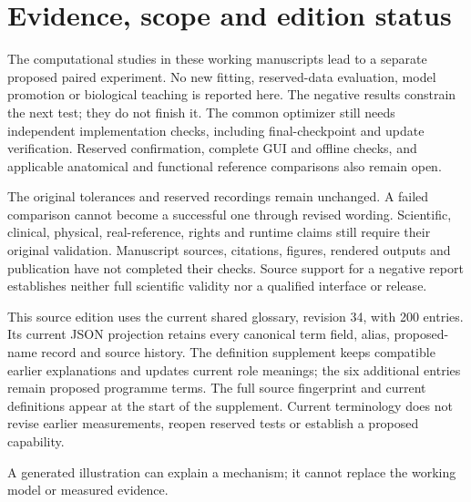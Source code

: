 \section*{Evidence, scope and edition status}
The computational studies in these working manuscripts lead to a
separate proposed paired experiment. No new fitting, reserved-data evaluation,
model promotion or biological teaching is reported here. The negative results
constrain the next test; they do not finish it. The common optimizer still needs
independent implementation checks, including final-checkpoint and update
verification. Reserved confirmation, complete GUI and offline checks, and
applicable anatomical and functional reference comparisons also remain open.

The original tolerances and reserved recordings remain unchanged. A failed
comparison cannot become a successful one through revised wording. Scientific,
clinical, physical, real-reference, rights and runtime claims still require
their original validation. Manuscript sources, citations, figures, rendered
outputs and publication have not completed their checks. Source support for a
negative report establishes neither full scientific validity nor a qualified
interface or release.

This source edition uses the current shared glossary, revision 34, with 200 entries.
Its current JSON projection retains every canonical term field, alias, proposed-name record and source history.
The definition supplement keeps compatible earlier explanations and updates current role meanings; the six additional entries remain proposed programme terms.
The full source fingerprint and current definitions appear at the start of the supplement.
Current terminology does not revise earlier measurements, reopen reserved tests or establish a proposed capability.

A generated illustration can explain a mechanism; it cannot replace
the working model or measured evidence.

\ifdefined\RSevenSixFourTechnicalPackagingRecord
